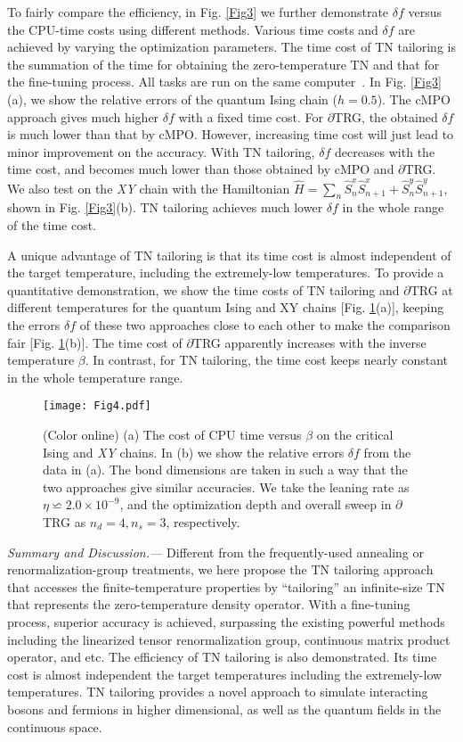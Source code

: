 \documentclass[aps,prl,twocolumn,superscriptaddress,a4paper,english,longbibliography]{revtex4-1}
\begin{document}
To fairly compare the efficiency, in Fig. \ref{Fig3} we further demonstrate $\delta f$ versus the CPU-time costs using different methods. Various time costs and $\delta f$ are achieved by varying the optimization parameters. The time cost of TN tailoring is the summation of the time for obtaining the zero-temperature TN and that for the fine-tuning process. All tasks are run on the same computer~\cite{time}. In Fig. \ref{Fig3}(a), we show the relative errors of the quantum Ising chain ($h=0.5$). The cMPO approach gives much higher $\delta f$ with a fixed time cost. For $\partial$TRG, the obtained $\delta f$ is much lower than that by cMPO. However, increasing time cost will just lead to minor improvement on the accuracy. With TN tailoring, $\delta f$ decreases with the time cost, and becomes much lower than those obtained by cMPO and $\partial$TRG. We also test on the {\it XY} chain with the Hamiltonian $\hat{H} = \sum_{n} \hat{S}_n^x \hat{S}_{n+1}^x + \hat{S}_n^y \hat{S}_{n+1}^y$, shown in Fig. \ref{Fig3}(b). TN tailoring achieves much lower $\delta f$ in the whole range of the time cost.



A unique advantage of TN tailoring is that its time cost is almost independent of the target temperature, including the extremely-low temperatures. To provide a quantitative demonstration, we show the time costs of TN tailoring and $\partial$TRG at different temperatures for the quantum Ising and XY chains [Fig. \ref{Fig4}(a)], keeping the errors $\delta f$ of these two approaches close to each other to make the comparison fair [Fig. \ref{Fig4}(b)]. The time cost of $\partial$TRG apparently increases with the inverse temperature $\beta$. In contrast, for TN tailoring, the time cost keeps nearly constant in the whole temperature range.

\begin{figure}[tbp]
	\centering
	\texttt{[image: Fig4.pdf]}
	\caption{(Color online) (a) The cost of CPU time versus $\beta$ on the critical Ising and {\it XY} chains. In (b) we show the relative errors $\delta f$ from the data in (a). The bond dimensions are taken in such a way that the two approaches give similar accuracies. We take the leaning rate as $\eta\backsimeq2.0\times10^{-9}$, and the optimization depth and overall sweep in $\partial$TRG as $n_{d}=4, n_s=3$, respectively.}
	\label{Fig4}
\end{figure}


{\it Summary and Discussion.---}
Different from the frequently-used annealing or renormalization-group treatments, we here propose the TN tailoring approach that accesses the finite-temperature properties by ``tailoring'' an infinite-size TN that represents the zero-temperature density operator. With a fine-tuning process, superior accuracy is achieved, surpassing the existing powerful methods including the linearized tensor renormalization group, continuous matrix product operator, and etc. The efficiency of TN tailoring is also demonstrated. Its time cost is almost independent  the target temperatures including the extremely-low temperatures. TN tailoring provides a novel approach to simulate interacting bosons and fermions in higher dimensional, as well as the quantum fields in the continuous space. 
\end{document}
